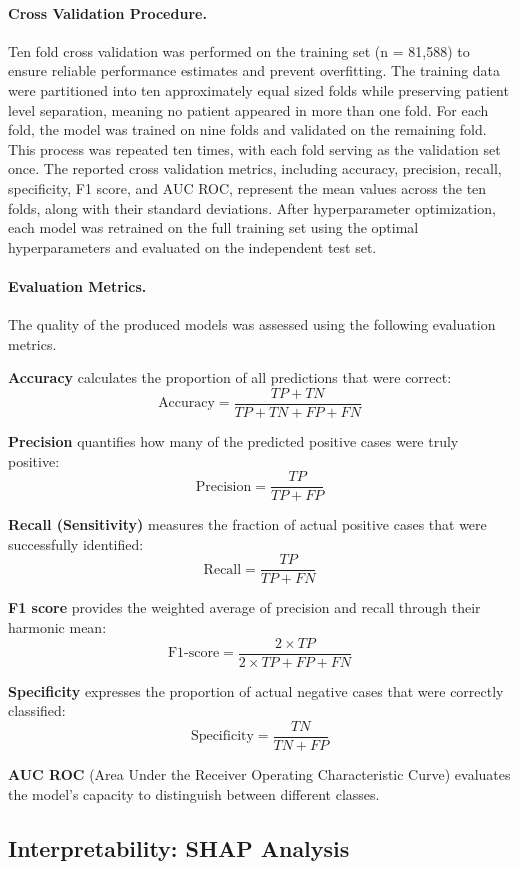 \documentclass[harvard,article]{frontiersinFPHY_FAMS}
\begin{document}
\paragraph{Cross Validation Procedure.}
Ten fold cross validation was performed on the training set (n = 81,588) to ensure reliable performance estimates and prevent overfitting. The training data were partitioned into ten approximately equal sized folds while preserving patient level separation, meaning no patient appeared in more than one fold. For each fold, the model was trained on nine folds and validated on the remaining fold. This process was repeated ten times, with each fold serving as the validation set once. The reported cross validation metrics, including accuracy, precision, recall, specificity, F1 score, and AUC ROC, represent the mean values across the ten folds, along with their standard deviations. After hyperparameter optimization, each model was retrained on the full training set using the optimal hyperparameters and evaluated on the independent test set.

\paragraph{Evaluation Metrics.}
The quality of the produced models was assessed using the following evaluation metrics.

\textbf{Accuracy} calculates the proportion of all predictions that were correct:
\[
\text{Accuracy} = \frac{TP + TN}{TP + TN + FP + FN}
\]

\textbf{Precision} quantifies how many of the predicted positive cases were truly positive:
\[
\text{Precision} = \frac{TP}{TP + FP}
\]

\textbf{Recall (Sensitivity)} measures the fraction of actual positive cases that were successfully identified:
\[
\text{Recall} = \frac{TP}{TP + FN}
\]

\textbf{F1 score} provides the weighted average of precision and recall through their harmonic mean:
\[
\text{F1-score} = \frac{2 \times TP}{2 \times TP + FP + FN}
\]

\textbf{Specificity} expresses the proportion of actual negative cases that were correctly classified:
\[
\text{Specificity} = \frac{TN}{TN + FP}
\]

\textbf{AUC ROC} (Area Under the Receiver Operating Characteristic Curve) evaluates the model's capacity to distinguish between different classes.

\subsection{Interpretability: SHAP Analysis}
\end{document}
